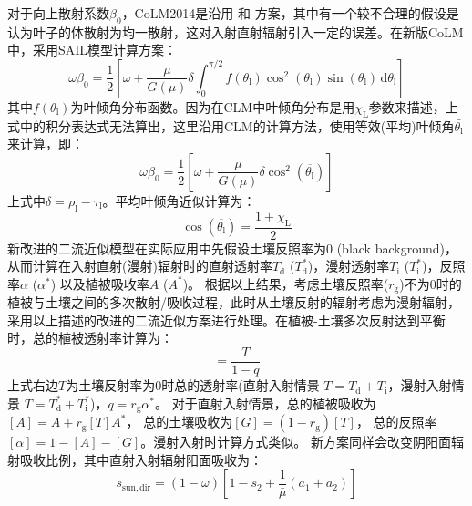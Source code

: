 对于向上散射系数$\beta_0$，CoLM2014是沿用 \citet{dickinson1983land} 和 \citet{sellers1985canopy} 方案，其中有一个较不合理的假设是认为叶子的体散射为均一散射，这对入射直射辐射引入一定的误差。在新版CoLM中，采用SAIL模型计算方案：
\begin{equation}
  \omega \beta_{0}=\frac{1}{2}\left[\omega+\frac{\mu}{G(\mu)} \delta \int_{0}^{\pi / 2}
  f\left(\theta_{\mathrm{l}}\right) \cos ^{2}\left(\theta_{\mathrm{l}}\right) \sin \left(\theta_{\mathrm{l}}\right)\,{\mathrm d} \theta_{\mathrm{l}}\right]
\end{equation}
其中$f\left(\theta_{\mathrm {l}}\right)$为叶倾角分布函数。因为在CLM中叶倾角分布是用$\chi_{\mathrm L}$参数来描述，上式中的积分表达式无法算出，这里沿用CLM的计算方法，使用等效(平均)叶倾角$\bar{\theta_{\mathrm {l}}}$来计算，即：
\begin{equation}
  \omega \beta_{0}=\frac{1}{2}\left[\omega+\frac{\mu}{G(\mu)} \delta \cos ^{2}\left(\overline{\theta_{\mathrm{l}}}\right)\right]
\end{equation}
上式中$\delta=\rho_{\mathrm {l}}-\tau_{\mathrm {l}}$。平均叶倾角近似计算为：
\begin{equation}
  \cos \left(\overline{\theta_{\mathrm{l}}}\right)=\frac{1+\chi_{\mathrm{L}}}{2}
\end{equation}
新改进的二流近似模型在实际应用中先假设土壤反照率为0 (black background)，从而计算在入射直射(漫射)辐射时的直射透射率$T_{\mathrm d}$ ($T_{\mathrm d}^\ast$)，漫射透射率$T_{\mathrm i}$ ($T_{\mathrm i}^\ast$)，反照率$\alpha$ ($\alpha^\ast$) 以及植被吸收率$A$ ($A^\ast$)。
根据以上结果，考虑土壤反照率($r_{\mathrm g}$)不为0时的植被与土壤之间的多次散射/吸收过程，此时从土壤反射的辐射考虑为漫射辐射，采用以上描述的改进的二流近似方案进行处理。在植被-土壤多次反射达到平衡时，总的植被透射率计算为：
\begin{equation}
  [T]=\frac{T}{1-q}
\end{equation}
上式右边$T$为土壤反射率为0时总的透射率(直射入射情景 $T=T_{\mathrm d}+T_{\mathrm i}$，漫射入射情景 $T=T_{\mathrm d}^\ast+T_{\mathrm i}^\ast$)，$q=r_{\mathrm {g}}\alpha^\ast$。
对于直射入射情景，总的植被吸收为$\left[A\right]=A+r_{\mathrm {g}}\left[T\right]A^\ast$，
总的土壤吸收为$\left[G\right]=\left(1-r_{\mathrm {g}}\right)\left[T\right]$，
总的反照率$\left[\alpha\right]=1-\left[A\right]-\left[G\right]$。漫射入射时计算方式类似。
新方案同样会改变阴阳面辐射吸收比例，其中直射入射辐射阳面吸收为：
\begin{equation}
  s_{\mathrm{sun,dir}}=(1-\omega)\left[1-s_{2}+\frac{1}{\bar{\mu}}\left(a_{1}+a_{2}\right)\right]
\end{equation}
